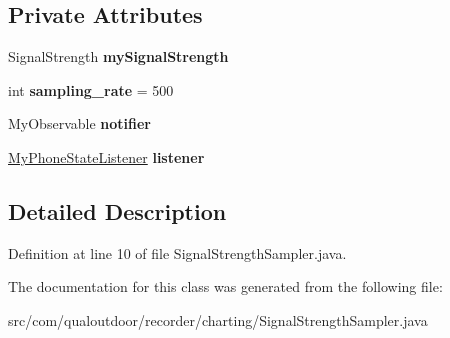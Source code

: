 \subsection*{Private Attributes}
\begin{DoxyCompactItemize}
\item 
\hypertarget{classcom_1_1qualoutdoor_1_1recorder_1_1charting_1_1SignalStrengthSampler_ac445c3c9fb238f7279991e4fff3ebd0a}{Signal\-Strength {\bfseries my\-Signal\-Strength}}\label{classcom_1_1qualoutdoor_1_1recorder_1_1charting_1_1SignalStrengthSampler_ac445c3c9fb238f7279991e4fff3ebd0a}

\item 
\hypertarget{classcom_1_1qualoutdoor_1_1recorder_1_1charting_1_1SignalStrengthSampler_a8575cdec7c0b13b077d3be1c470019ad}{int {\bfseries sampling\-\_\-rate} = 500}\label{classcom_1_1qualoutdoor_1_1recorder_1_1charting_1_1SignalStrengthSampler_a8575cdec7c0b13b077d3be1c470019ad}

\item 
\hypertarget{classcom_1_1qualoutdoor_1_1recorder_1_1charting_1_1SignalStrengthSampler_af52d000872841bb9e25e142d8bc88d18}{My\-Observable {\bfseries notifier}}\label{classcom_1_1qualoutdoor_1_1recorder_1_1charting_1_1SignalStrengthSampler_af52d000872841bb9e25e142d8bc88d18}

\item 
\hypertarget{classcom_1_1qualoutdoor_1_1recorder_1_1charting_1_1SignalStrengthSampler_a18c848bbd93ec27fb879b921069610d3}{\hyperlink{classcom_1_1qualoutdoor_1_1recorder_1_1charting_1_1SignalStrengthSampler_1_1MyPhoneStateListener}{My\-Phone\-State\-Listener} {\bfseries listener}}\label{classcom_1_1qualoutdoor_1_1recorder_1_1charting_1_1SignalStrengthSampler_a18c848bbd93ec27fb879b921069610d3}

\end{DoxyCompactItemize}


\subsection{Detailed Description}


Definition at line 10 of file Signal\-Strength\-Sampler.\-java.



The documentation for this class was generated from the following file\-:\begin{DoxyCompactItemize}
\item 
src/com/qualoutdoor/recorder/charting/Signal\-Strength\-Sampler.\-java\end{DoxyCompactItemize}
